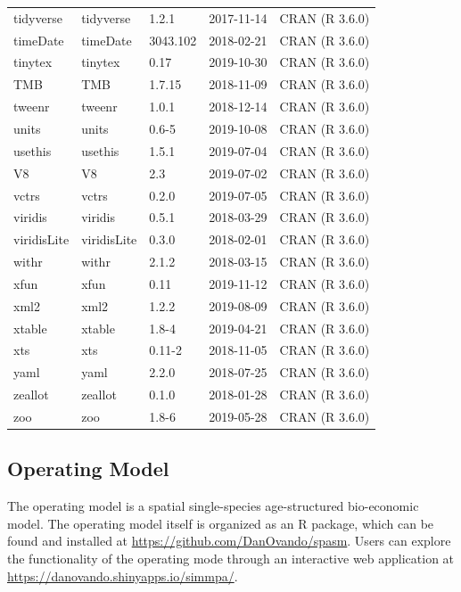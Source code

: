 \documentclass[]{article}
\begin{document}
\begin{longtable}[t]{lllll}
tidyverse & tidyverse & 1.2.1 & 2017-11-14 & CRAN (R 3.6.0)\\
timeDate & timeDate & 3043.102 & 2018-02-21 & CRAN (R 3.6.0)\\
tinytex & tinytex & 0.17 & 2019-10-30 & CRAN (R 3.6.0)\\
TMB & TMB & 1.7.15 & 2018-11-09 & CRAN (R 3.6.0)\\
\addlinespace
tweenr & tweenr & 1.0.1 & 2018-12-14 & CRAN (R 3.6.0)\\
units & units & 0.6-5 & 2019-10-08 & CRAN (R 3.6.0)\\
usethis & usethis & 1.5.1 & 2019-07-04 & CRAN (R 3.6.0)\\
V8 & V8 & 2.3 & 2019-07-02 & CRAN (R 3.6.0)\\
vctrs & vctrs & 0.2.0 & 2019-07-05 & CRAN (R 3.6.0)\\
\addlinespace
viridis & viridis & 0.5.1 & 2018-03-29 & CRAN (R 3.6.0)\\
viridisLite & viridisLite & 0.3.0 & 2018-02-01 & CRAN (R 3.6.0)\\
withr & withr & 2.1.2 & 2018-03-15 & CRAN (R 3.6.0)\\
xfun & xfun & 0.11 & 2019-11-12 & CRAN (R 3.6.0)\\
xml2 & xml2 & 1.2.2 & 2019-08-09 & CRAN (R 3.6.0)\\
\addlinespace
xtable & xtable & 1.8-4 & 2019-04-21 & CRAN (R 3.6.0)\\
xts & xts & 0.11-2 & 2018-11-05 & CRAN (R 3.6.0)\\
yaml & yaml & 2.2.0 & 2018-07-25 & CRAN (R 3.6.0)\\
zeallot & zeallot & 0.1.0 & 2018-01-28 & CRAN (R 3.6.0)\\
zoo & zoo & 1.8-6 & 2019-05-28 & CRAN (R 3.6.0)\\*
\end{longtable}

\hypertarget{operating-model}{%
\subsection{Operating Model}\label{operating-model}}

The operating model is a spatial single-species age-structured bio-economic model. The operating model itself is organized as an R package, which can be found and installed at \url{https://github.com/DanOvando/spasm}. Users can explore the functionality of the operating mode through an interactive web application at \url{https://danovando.shinyapps.io/simmpa/}.
\end{document}
